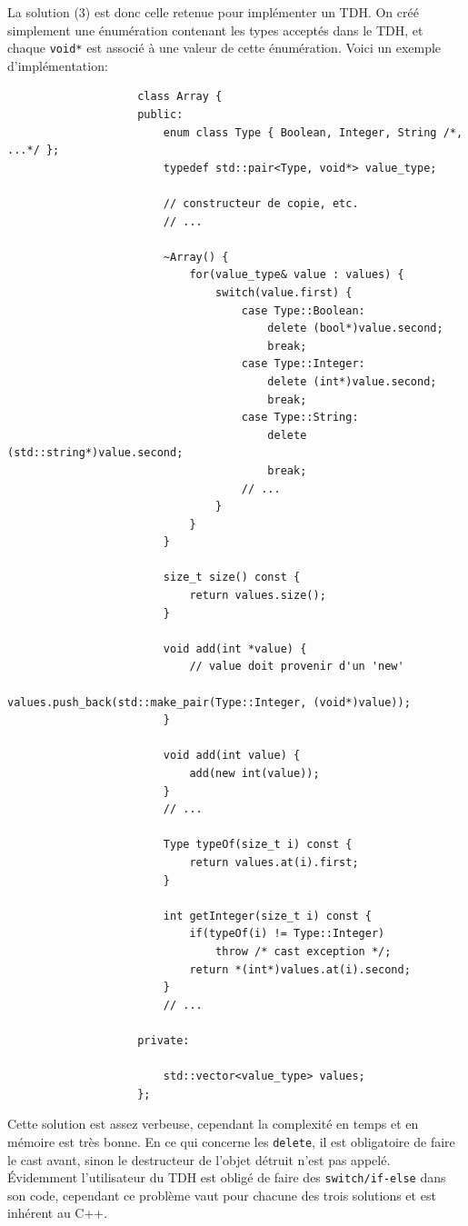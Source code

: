 \documentclass[french]{article}
\begin{document}
				La solution (3) est donc celle retenue pour implémenter un TDH. On créé simplement une énumération contenant les types acceptés dans le TDH, et chaque \texttt{void*} est associé à une valeur de cette énumération. Voici un exemple d'implémentation:
				
				\begin{lstlisting}
					class Array {
					public:
						enum class Type { Boolean, Integer, String /*, ...*/ };
						typedef std::pair<Type, void*> value_type;
						
						// constructeur de copie, etc.
						// ...
						
						~Array() {
							for(value_type& value : values) {
								switch(value.first) {
									case Type::Boolean:
										delete (bool*)value.second;
										break;
									case Type::Integer:
										delete (int*)value.second;
										break;
									case Type::String:
										delete (std::string*)value.second;
										break;
									// ...
								}
							}
						}
						
						size_t size() const {
							return values.size();
						}
						
						void add(int *value) { 
							// value doit provenir d'un 'new'
							values.push_back(std::make_pair(Type::Integer, (void*)value));
						}
						
						void add(int value) {
							add(new int(value));
						}
						// ...
						
						Type typeOf(size_t i) const {
							return values.at(i).first;
						}
						
						int getInteger(size_t i) const {
							if(typeOf(i) != Type::Integer)
								throw /* cast exception */;
							return *(int*)values.at(i).second;
						}
						// ...
						
					private:
					
						std::vector<value_type> values;
					};
				\end{lstlisting}
				
				Cette solution est assez verbeuse, cependant la complexité en temps et en mémoire est très bonne. En ce qui concerne les \texttt{delete}, il est obligatoire de faire le cast avant, sinon le destructeur de l'objet détruit n'est pas appelé.\\
				
				Évidemment l'utilisateur du TDH est obligé de faire des \texttt{switch/if-else} dans son code, cependant ce problème vaut pour chacune des trois solutions et est inhérent au C++.  
				
\end{document}

